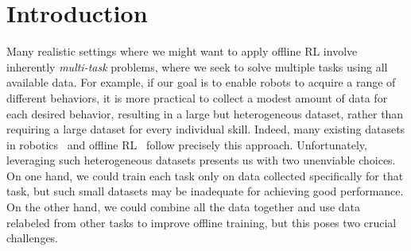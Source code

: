 \documentclass[../thesis.tex]{subfiles}
\begin{document}

\vspace{-0.2cm}
\section{Introduction}
\vspace{-0.2cm}

Many realistic settings where we might want to apply offline RL involve inherently \emph{multi-task} problems, where we seek to solve multiple tasks using all available data. For example, if our goal is to enable robots to acquire a range of different behaviors, it is more practical to collect a modest amount of data for each desired behavior, resulting in a large but heterogeneous dataset, rather than requiring a large dataset for every individual skill. Indeed, many existing datasets in robotics~\citep{finn2017deep, dasari2020robonet, sharma2018multiple} and offline RL~\citep{fu2020d4rl} follow precisely this approach.
Unfortunately, leveraging such heterogeneous datasets presents us with two unenviable choices. On one hand, we could train each task only on data collected specifically for that task, but such small datasets may be inadequate for achieving good performance. On the other hand, we could combine all the data together and use data relabeled from other tasks to improve offline training, but this poses two crucial challenges.
\end{document}

